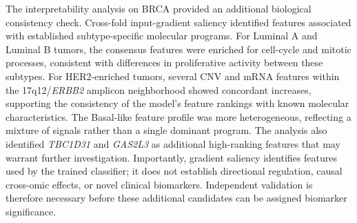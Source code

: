 \documentclass[lettersize,journal]{IEEEtran}
\begin{document}
The interpretability analysis on BRCA provided an additional biological consistency check. Cross-fold input-gradient saliency identified features associated with established subtype-specific molecular programs. For Luminal A and Luminal B tumors, the consensus features were enriched for cell-cycle and mitotic processes, consistent with differences in proliferative activity between these subtypes. For HER2-enriched tumors, several CNV and mRNA features within the 17q12/\textit{ERBB2} amplicon neighborhood showed concordant increases, supporting the consistency of the model's feature rankings with known molecular characteristics. The Basal-like feature profile was more heterogeneous, reflecting a mixture of signals rather than a single dominant program. The analysis also identified \textit{TBC1D31} and \textit{GAS2L3} as additional high-ranking features that may warrant further investigation. Importantly, gradient saliency identifies features used by the trained classifier; it does not establish directional regulation, causal cross-omic effects, or novel clinical biomarkers. Independent validation is therefore necessary before these additional candidates can be assigned biomarker significance.






 




\end{document}

